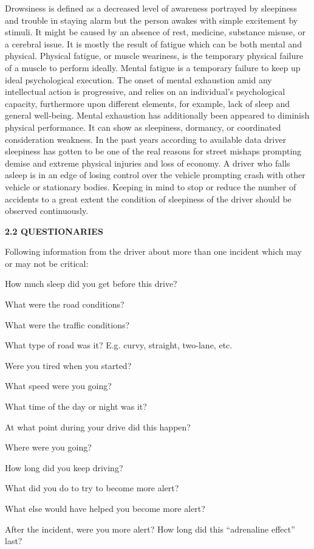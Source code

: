 \documentclass[a4paper,12pt]{article}
\begin{document}
Drowsiness is defined as a decreased level of awareness portrayed by
sleepiness and trouble in staying alarm but the person awakes with
simple excitement by stimuli. It might be caused by an absence of rest,
medicine, substance misuse, or a cerebral issue. It is mostly the result
of fatigue which can be both mental and physical. Physical fatigue, or
muscle weariness, is the temporary physical failure of a muscle to
perform ideally. Mental fatigue is a temporary failure to keep up ideal
psychological execution. The onset of mental exhaustion amid any
intellectual action is progressive, and relies on an individual's
psychological capacity, furthermore upon different elements, for
example, lack of sleep and general well-being. Mental exhaustion has
additionally been appeared to diminish physical performance. It can show
as sleepiness, dormancy, or coordinated consideration weakness. In the
past years according to available data driver sleepiness has gotten to
be one of the real reasons for street mishaps prompting demise and
extreme physical injuries and loss of economy. A driver who falls asleep
is in an edge of losing control over the vehicle prompting crash with
other vehicle or stationary bodies. Keeping in mind to stop or reduce
the number of accidents to a great extent the condition of sleepiness of
the driver should be observed continuously.

\textbf{2.2 QUESTIONARIES}

Following information from the driver about more than one incident which
may or may not be critical:

How much sleep did you get before this drive?

What were the road conditions?

What were the traffic conditions?

What type of road was it? E.g. curvy, straight, two-lane, etc.

Were you tired when you started?

What speed were you going?

What time of the day or night was it?

At what point during your drive did this happen?

Where were you going?

How long did you keep driving?

What did you do to try to become more alert?

What else would have helped you become more alert?

After the incident, were you more alert? How long did this ``adrenaline
effect'' last?
\end{document}
